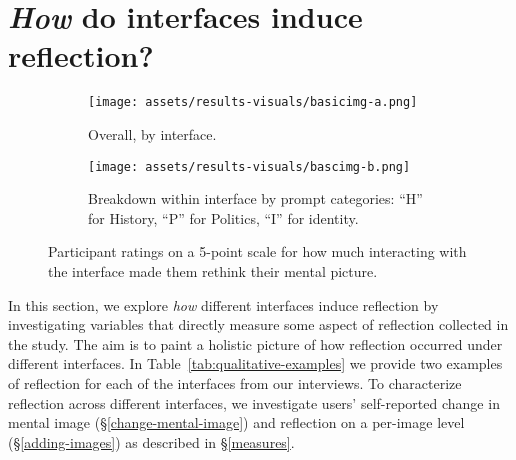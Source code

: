 \section{\textit{How} do interfaces induce reflection?} 
\label{how-reflection}


\begin{figure}[!b]
    \centering
    \begin{subfigure}[t]{0.55\textwidth}
        \centering
        \texttt{[image: assets/results-visuals/basicimg-a.png]}
        \caption{Overall, by interface.}
        \label{fig:subfig1}
    \end{subfigure}
    \hfill
    \begin{subfigure}[t]{0.44\textwidth}
        \centering
        \texttt{[image: assets/results-visuals/bascimg-b.png]}
        \caption{Breakdown within interface by prompt categories: ``H'' for History, ``P'' for Politics, ``I'' for identity.}
        \label{fig:subfig2}
    \end{subfigure}

    \caption{Participant ratings on a 5-point scale for how much interacting with the interface made them rethink their mental picture.}
    \label{fig:mental-image}
\end{figure}




In this section, we explore \textit{how} different interfaces induce reflection by investigating variables that directly measure some aspect of reflection collected in the study.
The aim is to paint a holistic picture of how reflection occurred under different interfaces. 
In Table~\ref{tab:qualitative-examples} we provide two examples of reflection for each of the interfaces from our interviews.
To characterize reflection across different interfaces, we investigate users' self-reported change in mental image (\S\ref{change-mental-image}) and reflection on a per-image level (\S\ref{adding-images}) as described in \S\ref{measures}.

